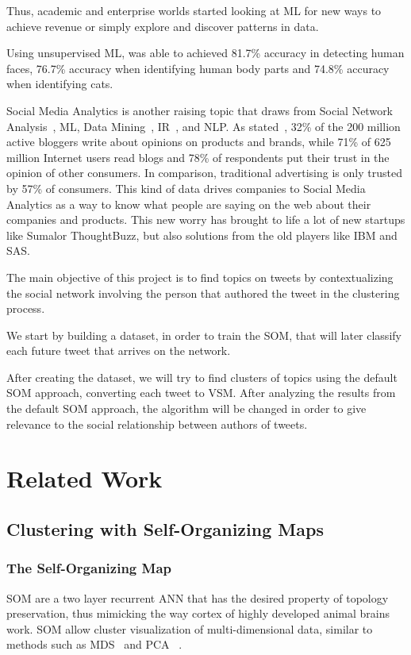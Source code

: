 \documentclass[journal]{IEEEtran}
\begin{document}
Thus, academic and enterprise worlds started looking at \ac{ML} for new ways to achieve revenue or simply explore and discover patterns in data. 

Using unsupervised \ac{ML}, \citet{Le2011} was able to achieved 81.7\% accuracy in detecting human faces, 76.7\% accuracy when identifying human body parts and 74.8\% accuracy when identifying cats. 

Social Media Analytics is another raising topic that draws from Social Network Analysis~\cite{knoke2008social}, \ac{ML}, Data Mining~\cite{witten2005data}, \ac{IR}~\cite{salton1983introduction}, and \ac{NLP}. As stated~\citet{Melville2009}, 32\% of the 200 million active bloggers write about opinions on products and brands, while 71\% of 625 million Internet users read blogs and 78\% of respondents put their trust in the opinion of other consumers. In comparison, traditional advertising is only trusted by 57\% of consumers.
This kind of data drives companies to Social Media Analytics as a way to know what people are saying on the web about their companies and products. This new worry has brought to life a lot of new startups like Sumalor ThoughtBuzz, but also solutions from the old players like IBM and SAS.

The main objective of this project is to find topics on tweets by contextualizing the social network involving the person that authored the tweet in the clustering process.

We start by building a dataset, in order to train the \ac{SOM}, that will later classify each future tweet that arrives on the network.

After creating the dataset, we will try to find clusters of topics using the default \ac{SOM} approach, converting each tweet to \ac{VSM}. After analyzing the results from the default \ac{SOM} approach, the algorithm will be changed in order to give relevance to the social relationship between authors of tweets.

\section{Related Work}
\label{sec:related_work}

\subsection{Clustering with Self-Organizing Maps} 
\label{sec:the_self_organizing_map}

\subsubsection{The Self-Organizing Map} 
\label{subsubsec:the_self_organizing_map}
\ac{SOM} are a two layer recurrent \ac{ANN} that has the desired property of topology preservation, thus mimicking the way cortex of highly developed animal brains work. \ac{SOM} allow cluster visualization of multi-dimensional data, similar to methods such as \ac{MDS}~\cite{KruskalWish1978} and \ac{PCA}~\cite{Hotelling_1933} .  
\end{document}
